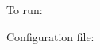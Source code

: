 To run\+:


\begin{DoxyCode}{0}

\end{DoxyCode}


Configuration file\+:


\begin{DoxyCode}{0}

\end{DoxyCode}
 